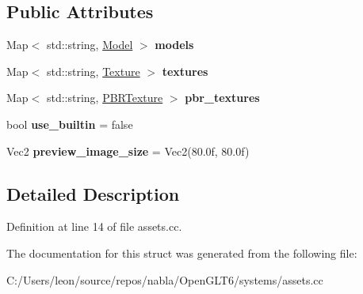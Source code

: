 \subsection*{Public Attributes}
\begin{DoxyCompactItemize}
\item 
\mbox{\label{structnabla_1_1_assets_system_1_1_data_adec039176bc2e07f4e8392229ed02b85}} 
Map$<$ std\+::string, \mbox{\hyperlink{structnabla_1_1_assets_system_1_1_data_1_1_model}{Model}} $>$ {\bfseries models}
\item 
\mbox{\label{structnabla_1_1_assets_system_1_1_data_a5aa7519382fca76f752cb93b80ac7eb8}} 
Map$<$ std\+::string, \mbox{\hyperlink{structnabla_1_1_assets_system_1_1_data_1_1_texture}{Texture}} $>$ {\bfseries textures}
\item 
\mbox{\label{structnabla_1_1_assets_system_1_1_data_aae82a25300ee3aa5729d2454da74846c}} 
Map$<$ std\+::string, \mbox{\hyperlink{structnabla_1_1_assets_system_1_1_data_1_1_p_b_r_texture}{P\+B\+R\+Texture}} $>$ {\bfseries pbr\+\_\+textures}
\item 
\mbox{\label{structnabla_1_1_assets_system_1_1_data_a221938716b2501050eaa68fcd142953b}} 
bool {\bfseries use\+\_\+builtin} = false
\item 
\mbox{\label{structnabla_1_1_assets_system_1_1_data_a439712f6510e0810d90a93a530b7dc8f}} 
Vec2 {\bfseries preview\+\_\+image\+\_\+size} = Vec2(80.\+0f, 80.\+0f)
\end{DoxyCompactItemize}


\subsection{Detailed Description}


Definition at line 14 of file assets.\+cc.



The documentation for this struct was generated from the following file\+:\begin{DoxyCompactItemize}
\item 
C\+:/\+Users/leon/source/repos/nabla/\+Open\+G\+L\+T6/systems/assets.\+cc\end{DoxyCompactItemize}
